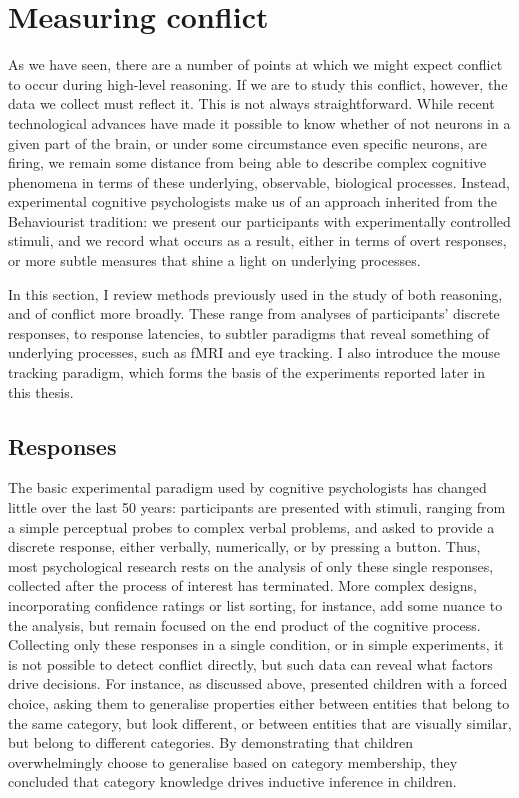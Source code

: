 


\section{Measuring conflict}
\label{sec:chapter1-measurement}

As we have seen, there are a number of points at which
we might expect conflict to occur during high-level reasoning.
If we are to study this conflict, however,
the data we collect must reflect it.
This is not always straightforward.
While recent technological advances have made it possible
to know whether of not neurons in a given part of the brain,
or under some circumstance even specific neurons, are firing,
we remain some distance from being able to
describe complex cognitive phenomena
in terms of these underlying, observable, biological processes.
Instead, experimental cognitive psychologists make us of an approach
inherited from the Behaviourist tradition:
we present our participants
with experimentally controlled stimuli,
and we record what occurs as a result,
either in terms of overt responses,
or more subtle measures that shine a light on underlying processes.

In this section, I review methods previously used in the study 
of both reasoning, and of conflict more broadly.
These range from analyses of participants' discrete responses,
to response latencies, to subtler paradigms that reveal
something of underlying processes, such as fMRI and eye tracking. 
I also introduce the mouse tracking paradigm,
which forms the basis of the experiments reported
later in this thesis.


\subsection{Responses}
\label{subsec:chapter1-measurement-responses}

The basic experimental paradigm used by cognitive psychologists
has changed little over the last 50 years:
participants are presented with stimuli,
ranging from a simple perceptual probes
to complex verbal problems,
and asked to provide a discrete response,
either verbally, numerically, or by pressing a button.
Thus, most %
psychological research rests on
the analysis of only these single responses,
collected after the process of interest has terminated.
More complex designs,
incorporating confidence ratings or list sorting,
for instance, add some nuance to the analysis,
but remain focused on the end product of the cognitive process.
Collecting only these responses in a single condition,
or in simple experiments,
it is not possible to detect conflict directly,
but such data can reveal what factors drive decisions.
For instance, as discussed above, \citet{Gelman1986} 
presented children with a forced choice,
asking them to generalise properties either
between entities that belong to the same category,
but look different,
or between entities that are visually similar,
but belong to different categories.
By demonstrating that children overwhelmingly choose
to generalise based on category membership,
they concluded that category knowledge
drives inductive inference in children.


